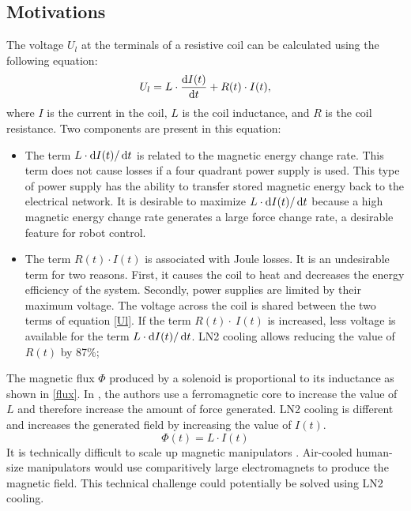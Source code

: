 \subsection{Motivations}
The voltage $U_l$ at the terminals of a resistive coil can be calculated using the following equation:
\begin{equation}
U_l=L\cdot\frac{\operatorname{d}\!{I}(t)}{\operatorname{d}\!{t}}+R(t)\cdot I(t),
\label{Ul}
\end{equation}
where $I$ is the current in the coil, $L$ is the coil inductance, and $R$ is the coil resistance.
Two components are present in this equation:
\begin{itemize}
\item The term $L\cdot \operatorname{d}\!{I}(t)/ \operatorname{d}\!{t}$ is related to the magnetic energy change rate. This term does not cause losses if a four quadrant power supply is used. This type of power supply has the ability to transfer stored magnetic energy back to the electrical network. It is desirable to maximize $L\cdot \operatorname{d}\!{I}(t)/ \operatorname{d}\!{t}$ because a high magnetic energy change rate generates a large force change rate, a desirable feature for robot control. 
\item The term $R(t)\cdot I(t)$ is associated with Joule losses. It is an undesirable term for two reasons. First, it causes the coil to heat and decreases the energy efficiency of the system. Secondly, power supplies are limited by their maximum voltage. The voltage across the coil is shared between the two terms of equation \ref{Ul}. If the term $R(t)\cdot~I(t)$ is increased, less voltage is available for the term $L\cdot \operatorname{d}\!{I}(t)/ \operatorname{d}\!{t}$. LN2 cooling allows reducing the value of $R(t)$ by 87\%;
\end{itemize}
The magnetic flux $\Phi$ produced by a solenoid is proportional to its inductance as shown in \eqref{flux}. In \cite{kummer2010octomag}, the authors use a ferromagnetic core to increase the value of $L$ and therefore increase the amount of force generated. LN2 cooling is different and increases the generated field by increasing the value of $I(t)$.
\begin{equation}
\Phi (t)=L\cdot I(t)
\label{flux}
\end{equation}
  It is technically difficult to scale up magnetic manipulators \cite{kummer2010octomag}. 
  Air-cooled human-size manipulators would use comparitively large electromagnets to produce the magnetic field.
  This technical challenge could potentially be solved using LN2 cooling.  
